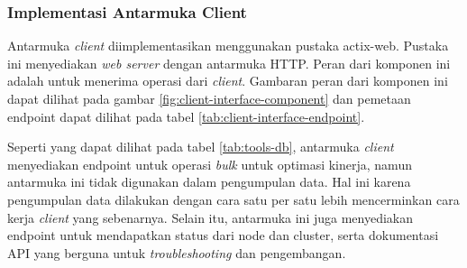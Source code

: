 \subsubsection{Implementasi Antarmuka Client}
\label{subsubsection:implementasi-antarmuka-client}

Antarmuka \textit{client} diimplementasikan menggunakan pustaka actix-web. Pustaka ini menyediakan \textit{web server} dengan antarmuka HTTP. Peran dari komponen ini adalah untuk menerima operasi dari \textit{client}. Gambaran peran dari komponen ini dapat dilihat pada gambar \ref{fig:client-interface-component} dan pemetaan endpoint dapat dilihat pada tabel \ref{tab:client-interface-endpoint}.

\begin{table}[h]
    \centering
    \caption{Endpoint dari Antarmuka Client}
    \label{tab:tools-db}
\end{table}

Seperti yang dapat dilihat pada tabel \ref{tab:tools-db}, antarmuka \textit{client} menyediakan endpoint untuk operasi \textit{bulk} untuk optimasi kinerja, namun antarmuka ini tidak digunakan dalam pengumpulan data. Hal ini karena pengumpulan data dilakukan dengan cara satu per satu lebih mencerminkan cara kerja \textit{client} yang sebenarnya. Selain itu, antarmuka ini juga menyediakan endpoint untuk mendapatkan status dari node dan cluster, serta dokumentasi API yang berguna untuk \textit{troubleshooting} dan pengembangan.
